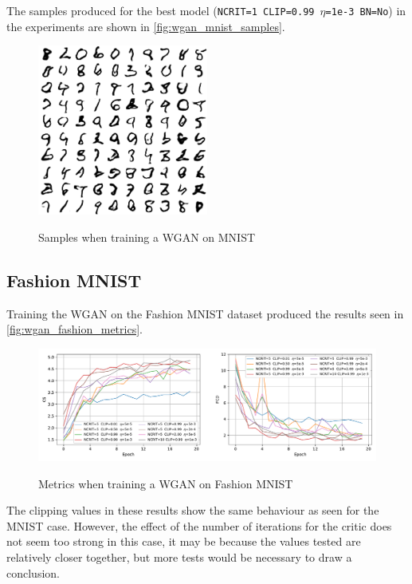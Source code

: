The samples produced for the best model (\texttt{NCRIT=1  CLIP=0.99  $\eta$=1e-3 BN=No}) in the experiments are shown in \autoref{fig:wgan_mnist_samples}.
\begin{figure}[hbt]
    \centering
    \caption{Samples when training a WGAN on MNIST}
    \includegraphics[width=0.5\textwidth]{chapters/Experiments/WGAN/mnist_samples.png}
    \label{fig:wgan_mnist_samples}
\end{figure}


\subsection{Fashion MNIST}
Training the \gls{WGAN} on the Fashion MNIST dataset produced the results seen in \autoref{fig:wgan_fashion_metrics}.
\begin{figure}[hbt]
    \centering
    \caption{Metrics when training a WGAN on Fashion MNIST}
    \includegraphics[width=\textwidth]{chapters/Experiments/WGAN/fashion_metrics.pdf}
    \label{fig:wgan_fashion_metrics}
\end{figure}

The clipping values in these results show the same behaviour as seen for the \gls{MNIST} case. However, the effect of the number of iterations for the critic does not seem too strong in this case, it may be because the values tested are relatively closer together, but more tests would be necessary to draw a conclusion.

